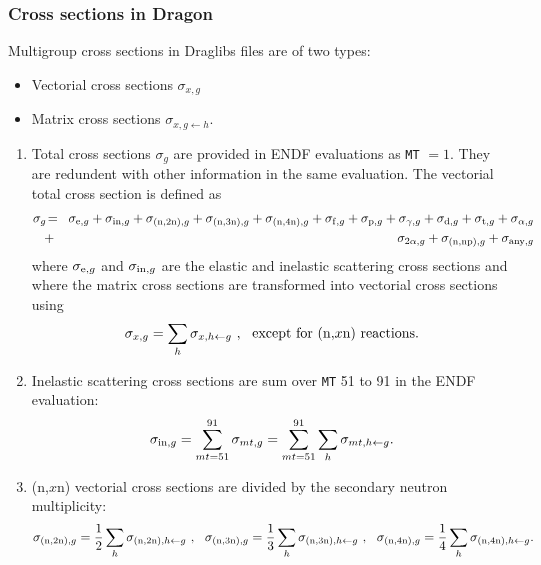 \subsubsection{Cross sections in Dragon}\label{sect:xs}
Multigroup cross sections in Draglibs files are of two types:
\begin{itemize}
\item Vectorial cross sections $\sigma_{x,g}$
\item Matrix cross sections $\sigma_{x,g\leftarrow h}.$
\end{itemize}
\begin{enumerate}
\item Total cross sections $\sigma_g$ are provided in ENDF evaluations as {\tt MT} $=1$. They are redundent with other information in the same evaluation. The vectorial total cross section is defined as
\begin{eqnarray}
\nonumber \sigma_g\negthinspace &=&\negthinspace \sigma_{{\rm e},g}+\sigma_{{\rm in},g}+\sigma_{{\rm (n,2n)},g}+\sigma_{{\rm (n,3n)},g}+\sigma_{{\rm (n,4n)},g}+\sigma_{{\rm f},g}+\sigma_{{\rm p},g}+\sigma_{\gamma,g}
+\sigma_{{\rm d},g}+\sigma_{{\rm t},g}+\sigma_{\alpha,g}\\
&+&\negthinspace \sigma_{2\alpha,g}+\sigma_{{\rm (n,np)},g}+\sigma_{{\rm any},g}
\end{eqnarray}
\noindent where $\sigma_{{\rm e},g}$ and $\sigma_{{\rm in},g}$ are the elastic and inelastic scattering cross sections and where the matrix cross sections are transformed into vectorial cross sections using
\begin{equation}
\sigma_{x,g}=\sum_h \sigma_{x,h\leftarrow g} \ , \ \ {\rm except \ for \ (n,}x{\rm n) \ reactions.}
\end{equation}
\item Inelastic scattering cross sections are sum over {\tt MT} 51 to 91 in the ENDF evaluation:
\begin{equation}
\sigma_{{\rm in},g}=\sum_{{\sl mt}=51}^{91} \sigma_{{\sl mt},g}=\sum_{{\sl mt}=51}^{91} \sum_h \sigma_{{\sl mt},h\leftarrow g} .
\end{equation}
\item (n,$x$n) vectorial cross sections are divided by the secondary neutron multiplicity:
\begin{equation}
\sigma_{{\rm (n,2n)},g}={1\over 2}\sum_h \sigma_{{\rm (n,2n)},h\leftarrow g} \ , \ \ \sigma_{{\rm (n,3n)},g}={1\over 3}\sum_h \sigma_{{\rm (n,3n)},h\leftarrow g} \ , \ \ \sigma_{{\rm (n,4n)},g}={1\over 4}\sum_h \sigma_{{\rm (n,4n)},h\leftarrow g} .

\end{equation}
\end{enumerate}
